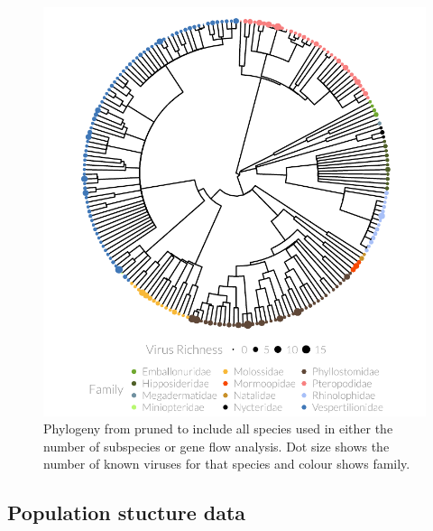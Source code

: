 \begin{knitrout}\footnotesize
{}\color{fgcolor}\begin{figure}[t]

{\centering \includegraphics[width=1\textwidth,trim = 0cm 0cm 0cm 0cm]{figure/treePlot-1} 

}

\caption[Pruned phylogeny with dot size showing number of pathogens and colour showing family.]{
Phylogeny from \cite{bininda2007delayed} pruned to include all species used in either the number of subspecies or gene flow analysis.
Dot size shows the number of known viruses for that species and colour shows family.
}\label{fig:treePlot}
\end{figure}


\end{knitrout}

\subsection{Population stucture data}

